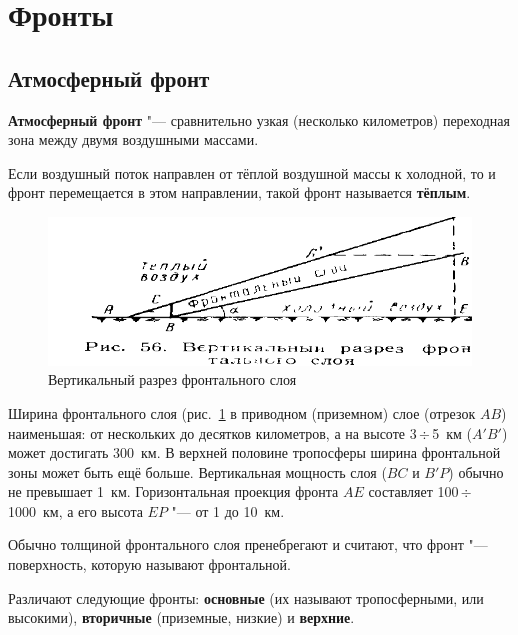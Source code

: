 \documentclass[a4paper, 12pt, twoside, draft, book, russian, fittopage, cyremdash, openright]{ncc}
\newcommand{\otdo}{\,\ensuremath{\div}\,}
\begin{document}
\section{Фронты}

\subsection{Атмосферный фронт}
\label{sec:front}

\textbf{Атмосферный фронт} "--- сравнительно
узкая (несколько километров) переходная зона между двумя воздушными
массами.

Если воздушный поток направлен от тёплой воздушной массы к холодной,
то и фронт перемещается в этом направлении, такой фронт называется
\textbf{тёплым}.

\begin{figure}[htb]
   \centering
   \includegraphics[scale=1.0]{05_vertical_front.pdf}
   \caption{Вертикальный разрез фронтального слоя}
   \label{fig:05_vertical_front}
\end{figure}

Ширина фронтального слоя (рис.~\ref{fig:05_vertical_front} в приводном
(приземном) слое (отрезок $AB$) наименьшая: от нескольких до десятков
километров, а на высоте 3\otdo5~км ($A'B'$) может достигать
300~км. В верхней половине тропосферы ширина фронтальной зоны может
быть ещё больше. Вертикальная мощность слоя ($BC$ и $B'P$) обычно не
превышает 1~км. Горизонтальная проекция фронта $AE$ составляет
100\otdo1000~км, а его высота $EP$ "--- от 1 до 10~км.

Обычно толщиной фронтального слоя пренебрегают и считают, что фронт
"--- поверхность, которую называют фронтальной.

Различают следующие фронты: \textbf{основные}
(их называют тропосферными, или
высокими), \textbf{вторичные}
(приземные, низкие) и
\textbf{верхние}.
\end{document}
